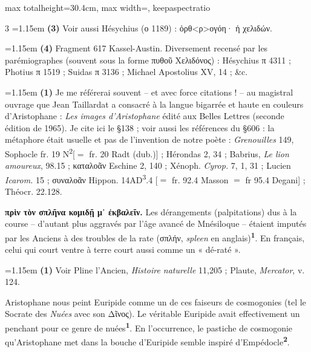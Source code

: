 \documentclass[11pt,twoside]{book}
\newcommand{\italique}[1]{\textit{#1}}
\newcommand{\expo}[1]{\textsuperscript{#1}}
\newcommand{\Apostol}{Michael Apostolius }
\newcommand{\Nauck}{N\expo{2}}
\newcommand{\anglais}[1]{\textit{#1}}
\newcommand{\marqueur}[1]{\textsuperscript{\color{rubricRed}\textbf{#1}}}
\begin{document}
\begin{adjustbox}{max totalheight=30.4cm, max width=\textwidth, keepaspectratio}
\begin{minipage}{\textwidth}
{\begin{multicols}{3}
\noindent\hangindent=1.15em {\color{sepiaNote}\textbf{(3)}} Voir aussi Hésychius (ο 1189) : ὀρθ<ρ>ογόη· ἡ χελιδών.
\par\vspace{1.5pt}
\noindent\hangindent=1.15em {\color{sepiaNote}\textbf{(4)}} Fragment 617 Kassel-Austin. Diversement recensé par les parémiographes (souvent sous la forme πυθοῦ Χελιδόνος) : Hésychius π 4311 ; Photius π 1519 ; Suidas π 3136 ; \Apostol XV, 14 ; \&c.
\par\vspace{1.5pt}
\noindent\hangindent=1.15em {\color{sepiaNote}\textbf{(1)}} Je me référerai souvent – et avec force citations ! – au magistral ouvrage que Jean Taillardat a consacré à la langue bigarrée et haute en couleurs d'Aristophane : \italique{Les images d'Aristophane} édité aux Belles Lettres (seconde édition de 1965). Je cite ici le §138 ; voir aussi les références du §606 : la métaphore était usuelle et pas de l'invention de notre poète : \italique{Grenouilles} 149, Sophocle fr. 19 \Nauck [$=$ fr. 20 Radt (dub.)] ; Hérondas 2, 34 ; Babrius, \italique{Le lion amoureux}, 98.15 ; καταλοᾶν Eschine 2, 140 ; Xénoph. \italique{Cyrop.} 7, 1, 31 ; Lucien \italique{Icarom.} 15 ; συναλοᾶν Hippon. 14AD\expo{3}.4 [$=$ fr. 92.4 Masson $=$ fr 95.4 Degani] ; Théocr. 22.128.
\par\vspace{1.5pt}
 \textbf{πρὶν τὸν σπλῆνα κομιδῇ μ᾽ ἐκβαλεῖν.} Les dérangements (palpitations) dus à la course – d'autant plus aggravés par l'âge avancé de Mnésiloque – étaient imputés par les Anciens à des troubles de la rate (σπλήν, \anglais{spleen} en anglais)\marqueur{1}. En français, celui qui court ventre à terre court aussi comme un « dé-raté ».
\par\vspace{1.5pt}
\par\vspace{1.2pt}\par\nopagebreak\vspace{1pt}\noindent\hangindent=1.15em {\color{sepiaNote}\textbf{(1)}} Voir Pline l'Ancien, \italique{Histoire naturelle} 11,205 ; Plaute, \italique{Mercator}, v. 124.
\par\vspace{1.5pt}
 \textbf{} Aristophane nous peint Euripide comme un de ces faiseurs de cosmogonies (tel le Socrate des \italique{Nuées} avec son Δῖνος). Le véritable Euripide avait effectivement un penchant pour ce genre de nuées\marqueur{1}. En l'occurrence, le pastiche de cosmogonie qu'Aristophane met dans la bouche d'Euripide semble inspiré d'Empédocle\marqueur{2}.

\end{multicols}}
\end{minipage}
\end{adjustbox}
\end{document}
